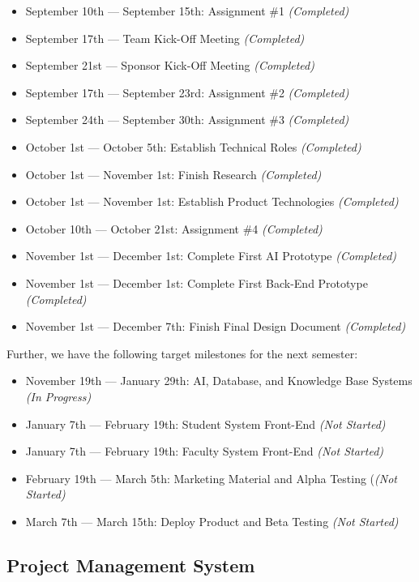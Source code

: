 \documentclass[titlepage, 12pt]{article}
\begin{document}
\begin{itemize}
    \item September 10th — September 15th: Assignment \#1 \emph{(Completed)}
    \item September 17th — Team Kick-Off Meeting \emph{(Completed)}
    \item September 21st — Sponsor Kick-Off Meeting \emph{(Completed)}
    \item September 17th — September 23rd: Assignment \#2 \emph{(Completed)}
    \item September 24th — September 30th: Assignment \#3 \emph{(Completed)}
    \item October 1st — October 5th: Establish Technical Roles \emph{(Completed)}
    \item October 1st — November 1st: Finish Research \emph{(Completed)}
    \item October 1st — November 1st: Establish Product Technologies \emph{(Completed)}
    \item October 10th — October 21st: Assignment \#4 \emph{(Completed)}
    \item November 1st — December 1st: Complete First AI Prototype \emph{(Completed)}
    \item November 1st — December 1st: Complete First Back-End Prototype \emph{(Completed)}
    \item November 1st — December 7th: Finish Final Design Document \emph{(Completed)}
\end{itemize}

Further, we have the following target milestones for the next semester:

\begin{itemize}
    \item November 19th — January 29th: AI, Database, and Knowledge Base Systems \emph{(In Progress)}
    \item January 7th — February 19th: Student System Front-End \emph{(Not Started)}
    \item January 7th — February 19th: Faculty System Front-End \emph{(Not Started)}
    \item February 19th — March 5th: Marketing Material and Alpha Testing (\emph{(Not Started)}
    \item March 7th — March 15th: Deploy Product and Beta Testing \emph{(Not Started)}
\end{itemize}

\subsection{Project Management System}
\end{document}
